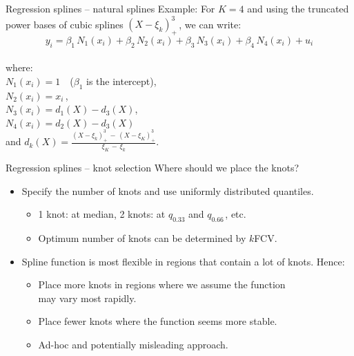 \documentclass{beamer}
\begin{document}
\begin{frame}{Regression splines -- natural splines}
Example: For $K\!=\!4$ and using the truncated power bases of cubic splines $(X-\xi_k)_{+}^3 \,$, we can write:
$$y_i = \beta_1 \, N_1 (x_i)  + \beta_2 \, N_2 (x_i) + \beta_3 \, N_3 (x_i) + \beta_4 \, N_4 (x_i) + u_i  $$\\
\vspace{-0.2cm}
where:\\
\smallskip
\qquad $N_1 (x_i) = 1$\, \hspace{3.5cm} ~($\beta_1$ is the intercept),\\
\smallskip
\qquad $N_2 (x_i) = x_i$\,,\\
\smallskip
\qquad $N_3 (x_i) = d_1(X)-d_{3}(X)$,\\
\smallskip
\qquad $N_4 (x_i) = d_2(X)-d_{3}(X)$\\
\medskip
\qquad and $d_k(X)=\frac{(X-\xi_k)_{+}^3 \,-\, (X-\xi_K)_{+}^3}{\xi_K \,-\, \xi_k}$.\\
\end{frame}
\begin{frame}{Regression splines -- knot selection}
Where should we place the knots?\\
\bigskip
\begin{itemize}
    \item Specify the number of knots and use uniformly distributed quantiles.\\
    \medskip    
    \begin{itemize}
        \item 1 knot: at median, 2 knots: at $q_{0.33}$ and $q_{0.66\,}$, etc.
        \smallskip
        \item Optimum number of knots can be determined by $k$FCV.
    \end{itemize}
    \bigskip
    \item Spline function is most flexible in regions that contain a lot of knots. Hence:\\
    \medskip    
    \begin{itemize}
        \item Place more knots in regions where we assume the function \\may vary most rapidly.
        \smallskip
        \item Place fewer knots where the function seems more stable.
        \smallskip
        \item Ad-hoc and potentially misleading approach.
    \end{itemize}
\end{itemize}
\end{frame}
\end{document}
